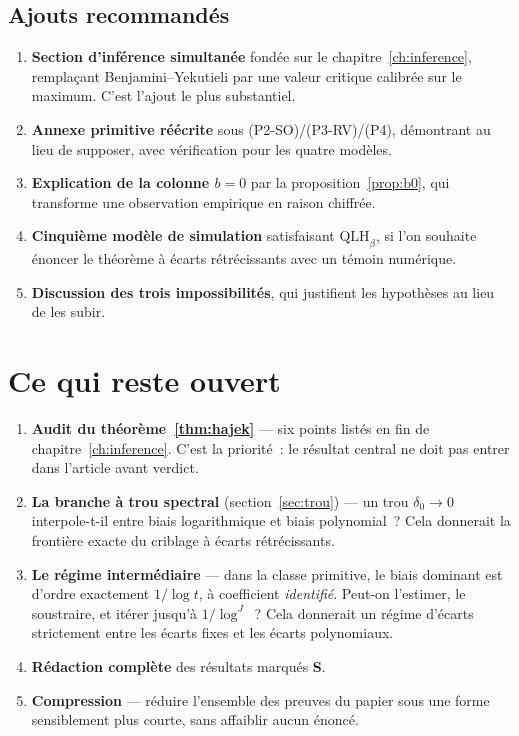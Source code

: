 \documentclass[11pt]{article}
\theoremstyle{plain}
\theoremstyle{definition}
\theoremstyle{remark}
\newcommand{\1}{\mathbf 1}
\begin{document}
\subsection{Ajouts recommandés}

\begin{enumerate}[leftmargin=2em,itemsep=4pt]
\item \textbf{Section d'inférence simultanée} fondée sur le
chapitre~\ref{ch:inference}, remplaçant Benjamini--Yekutieli par une
valeur critique calibrée sur le maximum. C'est l'ajout le plus
substantiel.
\item \textbf{Annexe primitive réécrite} sous (P2-SO)/(P3-RV)/(P4),
démontrant au lieu de supposer, avec vérification pour les quatre
modèles.
\item \textbf{Explication de la colonne $b=0$} par la
proposition~\ref{prop:b0}, qui transforme une observation empirique en
raison chiffrée.
\item \textbf{Cinquième modèle de simulation} satisfaisant
$\mathrm{QLH}_\beta$, si l'on souhaite énoncer le théorème à écarts
rétrécissants avec un témoin numérique.
\item \textbf{Discussion des trois impossibilités}, qui justifient les
hypothèses au lieu de les subir.
\end{enumerate}

\section{Ce qui reste ouvert}

\begin{enumerate}[leftmargin=2em,itemsep=4pt]
\item \textbf{Audit du théorème~\ref{thm:hajek}} --- six points listés
en fin de chapitre~\ref{ch:inference}. C'est la priorité~: le résultat
central ne doit pas entrer dans l'article avant verdict.
\item \textbf{La branche à trou spectral} (section~\ref{sec:trou}) --- un
trou $\delta_0\to0$ interpole-t-il entre biais logarithmique et biais
polynomial~? Cela donnerait la frontière exacte du criblage à écarts
rétrécissants.
\item \textbf{Le régime intermédiaire} --- dans la classe primitive, le
biais dominant est d'ordre exactement $1/\log t$, à coefficient
\emph{identifié}. Peut-on l'estimer, le soustraire, et itérer jusqu'à
$1/\log^J$~? Cela donnerait un régime d'écarts strictement entre les
écarts fixes et les écarts polynomiaux.
\item \textbf{Rédaction complète} des résultats marqués \textbf{S}.
\item \textbf{Compression} --- réduire l'ensemble des preuves du papier
sous une forme sensiblement plus courte, sans affaiblir aucun énoncé.
\end{enumerate}
\end{document}
